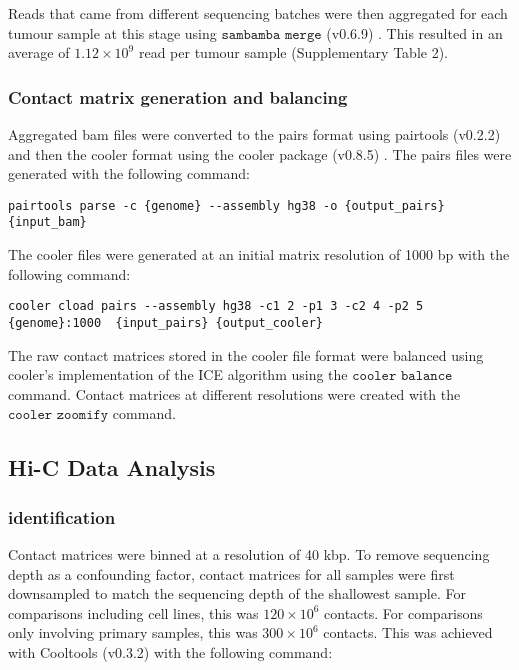Reads that came from different sequencing batches were then aggregated for each tumour sample at this stage using $\texttt{sambamba merge}$ (v0.6.9) \cite{tarasovSambambaFastProcessing2015}.
This resulted in an average of $1.12 \times 10^9$ read per tumour sample (Supplementary Table 2).

\subsubsection{Contact matrix generation and balancing}

Aggregated \gls{bam} files were converted to the pairs format using pairtools (v0.2.2) \cite{goloborodkoMirnylabPairtoolsV02019} and then the cooler format using the cooler package (v0.8.5) \cite{abdennurCoolerScalableStorage2020}.
The pairs files were generated with the following command:

\begin{lstlisting}[basicstyle=\ttfamily]
pairtools parse -c {genome} --assembly hg38 -o {output_pairs} {input_bam}
\end{lstlisting}

The cooler files were generated at an initial matrix resolution of 1000 bp with the following command:

\begin{lstlisting}[basicstyle=\ttfamily]
cooler cload pairs --assembly hg38 -c1 2 -p1 3 -c2 4 -p2 5 {genome}:1000  {input_pairs} {output_cooler}
\end{lstlisting}

The raw contact matrices stored in the cooler file format were balanced using cooler's implementation of the ICE algorithm \cite{imakaevIterativeCorrectionHiC2012} using the $\texttt{cooler balance}$ command.
Contact matrices at different resolutions were created with the $\texttt{cooler zoomify}$ command.

\subsection{Hi-C Data Analysis}

\subsubsection{ identification}

Contact matrices were binned at a resolution of 40 kbp.
To remove sequencing depth as a confounding factor, contact matrices for all samples were first downsampled to match the sequencing depth of the shallowest sample.
For comparisons including cell lines, this was $120 \times 10^6$ contacts.
For comparisons only involving primary samples, this was $300 \times 10^6$ contacts.
This was achieved with Cooltools (v0.3.2) \cite{venevMirnylabCooltoolsV02020} with the following command:

